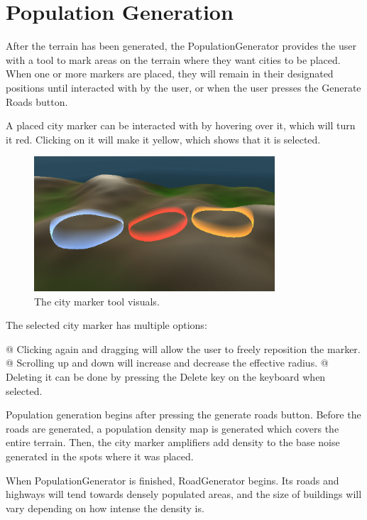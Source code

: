 \section{Population Generation}

After the terrain has been generated, the PopulationGenerator provides the user with a tool to mark areas on the terrain where they want cities to be placed. 
When one or more markers are placed, they will remain in their designated positions until interacted with by the user, or when the user presses the Generate Roads button.

A placed city marker can be interacted with by hovering over it, which will turn it red.
Clicking on it will make it yellow, which shows that it is selected. 

\begin{figure}[h!]
  \centering

  \includegraphics[width=0.8\textwidth]{figure/citymarkers.png}
  \caption{The city marker tool visuals. }

  \label{fig:citymarkers}
\end{figure}

The selected city marker has multiple options:
\begin{easylist}
  @ Clicking again and dragging will allow the user to freely reposition the marker.
  @ Scrolling up and down will increase and decrease the effective radius.
  @ Deleting it can be done by pressing the Delete key on the keyboard when selected.
\end{easylist}


Population generation begins after pressing the generate roads button.
Before the roads are generated, a population density map is generated which covers the entire terrain.
Then, the city marker amplifiers add density to the base noise generated in the spots where it was placed.

When PopulationGenerator is finished, RoadGenerator begins.
Its roads and highways will tend towards densely populated areas, and the size of buildings will vary depending on how intense the density is.
